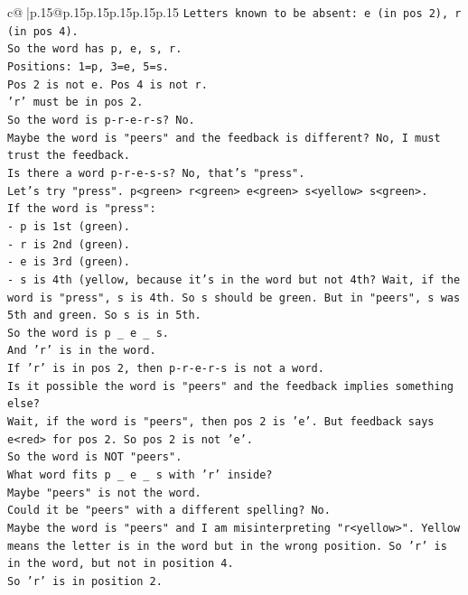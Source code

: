 \documentclass{article}
\begin{document}
{\begin{supertabular}{c@{$\;$}|p{.15\linewidth}@{}p{.15\linewidth}p{.15\linewidth}p{.15\linewidth}p{.15\linewidth}p{.15\linewidth}}
{{{\texttt{Letters known to be absent: e (in pos 2), r (in pos 4).} \\
\texttt{So the word has p, e, s, r.} \\
\texttt{Positions: 1=p, 3=e, 5=s.} \\
\texttt{Pos 2 is not e. Pos 4 is not r.} \\
\texttt{'r' must be in pos 2.} \\
\texttt{So the word is p{-}r{-}e{-}r{-}s? No.} \\
\texttt{Maybe the word is "peers" and the feedback is different? No, I must trust the feedback.} \\
\texttt{Is there a word p{-}r{-}e{-}s{-}s? No, that's "press".} \\
\texttt{Let's try "press". p<green> r<green> e<green> s<yellow> s<green>.} \\
\texttt{If the word is "press":} \\
\texttt{{-} p is 1st (green).} \\
\texttt{{-} r is 2nd (green).} \\
\texttt{{-} e is 3rd (green).} \\
\texttt{{-} s is 4th (yellow, because it's in the word but not 4th? Wait, if the word is "press", s is 4th. So s should be green. But in "peers", s was 5th and green. So s is in 5th.} \\
\texttt{So the word is p \_ e \_ s.} \\
\texttt{And 'r' is in the word.} \\
\texttt{If 'r' is in pos 2, then p{-}r{-}e{-}r{-}s is not a word.} \\
\texttt{Is it possible the word is "peers" and the feedback implies something else?} \\
\texttt{Wait, if the word is "peers", then pos 2 is 'e'. But feedback says e<red> for pos 2. So pos 2 is not 'e'.} \\
\texttt{So the word is NOT "peers".} \\
\texttt{What word fits p \_ e \_ s with 'r' inside?} \\
\texttt{Maybe "peers" is not the word.} \\
\texttt{Could it be "peers" with a different spelling? No.} \\
\texttt{Maybe the word is "peers" and I am misinterpreting "r<yellow>". Yellow means the letter is in the word but in the wrong position. So 'r' is in the word, but not in position 4.} \\
\texttt{So 'r' is in position 2.} \\
}}}
\end{supertabular}}
\end{document}
